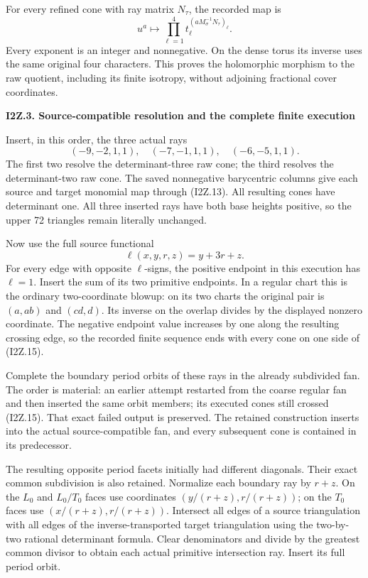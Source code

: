 For every refined cone with ray matrix \(N_\tau\), the recorded map is
\[
 u^a\longmapsto
 \prod_{\ell=1}^4 t_\ell^{(aM_\sigma^{-1}N_\tau)_\ell}.
 \tag{I2Z.13}
\]
Every exponent is an integer and nonnegative. On the dense torus its
inverse uses the same original four characters. This proves the
holomorphic morphism to the raw quotient, including its finite
isotropy, without adjoining fractional cover coordinates.

\par

\medskip\noindent\textbf{I2Z.3. Source-compatible resolution and the complete finite execution}

\par\nobreak

Insert, in this order, the three actual rays
\[
 (-9,-2,1,1),\quad(-7,-1,1,1),\quad(-6,-5,1,1).
 \tag{I2Z.14}
\]
The first two resolve the determinant-three raw cone; the third
resolves the determinant-two raw cone. The saved nonnegative
barycentric columns give each source and target monomial map through
(I2Z.13). All resulting cones have determinant one. All three inserted
rays have both base heights positive, so the upper 72 triangles remain
literally unchanged.

Now use the full source functional
\[
 \ell(x,y,r,z)=y+3r+z.
 \tag{I2Z.15}
\]
For every edge with opposite \(\ell\)-signs, the positive endpoint in
this execution has \(\ell=1\). Insert the sum of its two primitive
endpoints. In a regular chart this is the ordinary two-coordinate
blowup: on its two charts the original pair is \((a,ab)\) and
\((cd,d)\). Its inverse on the overlap divides by the displayed
nonzero coordinate. The negative endpoint value increases by one
along the resulting crossing edge, so the recorded finite sequence
ends with every cone on one side of (I2Z.15).

Complete the boundary period orbits of these rays in the already
subdivided fan. The order is material: an earlier attempt restarted
from the coarse regular fan and then inserted the same orbit members;
its executed cones still crossed (I2Z.15). That exact failed output is
preserved. The retained construction inserts into the actual
source-compatible fan, and every subsequent cone is contained in its
predecessor.

The resulting opposite period facets initially had different
diagonals. Their exact common subdivision is also retained. Normalize
each boundary ray by \(r+z\). On the \(L_0\) and \(L_0/T_0\) faces use
coordinates \((y/(r+z),r/(r+z))\); on the \(T_0\) faces use
\((x/(r+z),r/(r+z))\). Intersect all edges of a source triangulation
with all edges of the inverse-transported target triangulation using
the two-by-two rational determinant formula. Clear denominators and
divide by the greatest common divisor to obtain each actual primitive
intersection ray. Insert its full period orbit.

